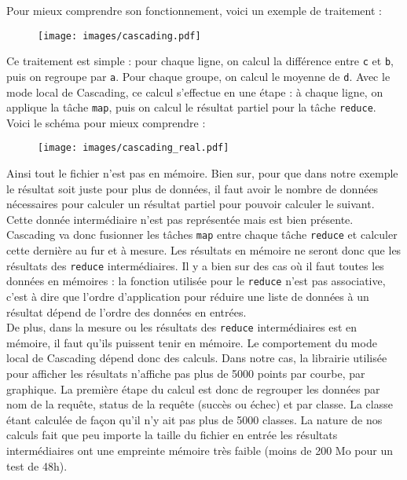 Pour mieux comprendre son fonctionnement, voici un exemple de traitement :
\begin{figure}[H]
	\centering
	\texttt{[image: images/cascading.pdf]}
\end{figure}

Ce traitement est simple : pour chaque ligne, on calcul la différence entre \verb+c+ et \verb+b+, puis on regroupe par \verb+a+. Pour chaque groupe, on calcul le moyenne de \verb+d+. Avec le mode local de Cascading, ce calcul s'effectue en une étape : à chaque ligne, on applique la tâche \verb+map+, puis on calcul le résultat partiel pour la tâche \verb+reduce+. Voici le schéma pour mieux comprendre :

\begin{figure}[H]
	\centering
	\texttt{[image: images/cascading\_real.pdf]}
\end{figure}

Ainsi tout le fichier n'est pas en mémoire. Bien sur, pour que dans notre exemple le résultat soit juste pour plus de données, il faut avoir le nombre de données nécessaires pour calculer un résultat partiel pour pouvoir calculer le suivant. Cette donnée intermédiaire n'est pas représentée mais est bien présente.\\

Cascading va donc fusionner les tâches \verb+map+ entre chaque tâche \verb+reduce+ et calculer cette dernière au fur et à mesure. Les résultats en mémoire ne seront donc que les résultats des \verb+reduce+ intermédiaires. Il y a bien sur des cas où il faut toutes les données en mémoires : la fonction utilisée pour le \verb+reduce+ n'est pas associative, c'est à dire que l'ordre d'application pour réduire une liste de données à un résultat dépend de l'ordre des données en entrées.\\

De plus, dans la mesure ou les résultats des \verb+reduce+ intermédiaires est en mémoire, il faut qu'ils puissent tenir en mémoire. Le comportement du mode local de Cascading dépend donc des calculs. Dans notre cas, la librairie utilisée pour afficher les résultats n'affiche pas plus de 5000 points par courbe, par graphique. La première étape du calcul est donc de regrouper les données par nom de la requête, status de la requête (succès ou échec) et par classe. La classe étant calculée de façon qu'il n'y ait pas plus de 5000 classes. La nature de nos calculs fait que peu importe la taille du fichier en entrée les résultats intermédiaires ont une empreinte mémoire très faible (moins de 200 Mo pour un test de 48h).\\

